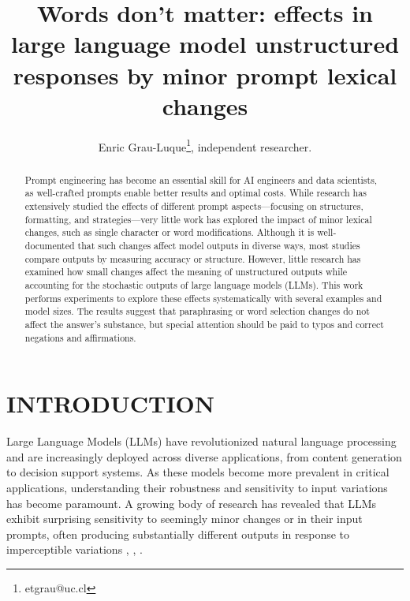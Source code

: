 \documentclass[a4paper,
               ]{jacow}
\begin{document}
\title{Words don't matter: effects in large language model unstructured responses by minor prompt lexical changes}

\author{Enric Grau-Luque\thanks{etgrau@uc.cl}, independent researcher.}
	
\maketitle

%
\begin{abstract}
Prompt engineering has become an essential skill for AI engineers and data scientists, as well-crafted prompts enable better results and optimal costs. While research has extensively studied the effects of different prompt aspects—focusing on structures, formatting, and strategies—very little work has explored the impact of minor lexical changes, such as single character or word modifications. Although it is well-documented that such changes affect model outputs in diverse ways, most studies compare outputs by measuring accuracy or structure. However, little research has examined how small changes affect the meaning of unstructured outputs while accounting for the stochastic outputs of large language models (LLMs). This work performs experiments to explore these effects systematically with several examples and model sizes. The results suggest that paraphrasing or word selection changes do not affect the answer's substance, but special attention should be paid to typos and correct negations and affirmations.
\end{abstract}

\section{INTRODUCTION}
Large Language Models (LLMs) have revolutionized natural language processing and are increasingly deployed across diverse applications, from content generation to decision support systems. As these models become more prevalent in critical applications, understanding their robustness and sensitivity to input variations has become paramount. A growing body of research has revealed that LLMs exhibit surprising sensitivity to seemingly minor changes or in their input prompts, often producing substantially different outputs in response to imperceptible variations \cite{sclar2024}, \cite{chatterjee2024}, \cite{zhan2024}.
\end{document}
